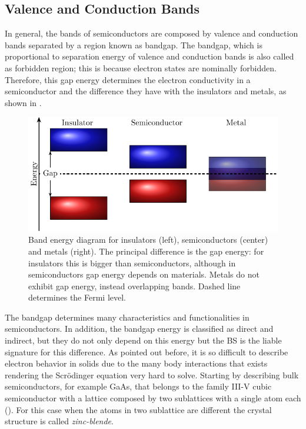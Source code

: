 \subsection{Valence and Conduction Bands}
\label{subsec:chapter-1-valence-and-conduction-bands}
\vspace{-10mm}
In general,  the bands of semiconductors are composed by valence and conduction bands separated by a  region known as bandgap. 
The bandgap, which is proportional to separation energy of valence and conduction bands is also called as forbidden region; this is because electron states are nominally forbidden. Therefore, this gap energy determines the electron conductivity in a semiconductor and the difference they have with the insulators and metals, as shown in .  

\begin{figure}[h!]
	\centering
	\includegraphics[width=\linewidth]{../figures/chapter-1/solid-sort/build/solid-sort}
	\caption{
Band energy diagram for insulators (left), semiconductors (center) and metals (right). The principal difference is the gap energy: for insulators this is bigger than semiconductors, although in semiconductors gap energy depends on materials. Metals do not exhibit gap energy, instead overlapping bands. Dashed line determines the Fermi level.
	}
	\label{fig:subsubsection-1.1.1-solid-types}
\end{figure}

The bandgap determines many characteristics and functionalities in semiconductors. In addition, the bandgap energy is classified as direct and indirect, but they do not only depend on this energy but the \gls{BS} is the liable signature for this difference. As pointed out before, it is so difficult to describe electron behavior in solids due to the many body interactions that exists rendering the Scr\"odinger equation very hard to solve. 
Starting by describing bulk semiconductors, for example GaAs, that belongs to the  family III-V cubic semiconductor with a lattice composed by two sublattices with a single atom each (). For this case when the atoms in two sublattice are different the crystal structure is called \emph{zinc-blende}\cite{vurgaftman2020bands}.

